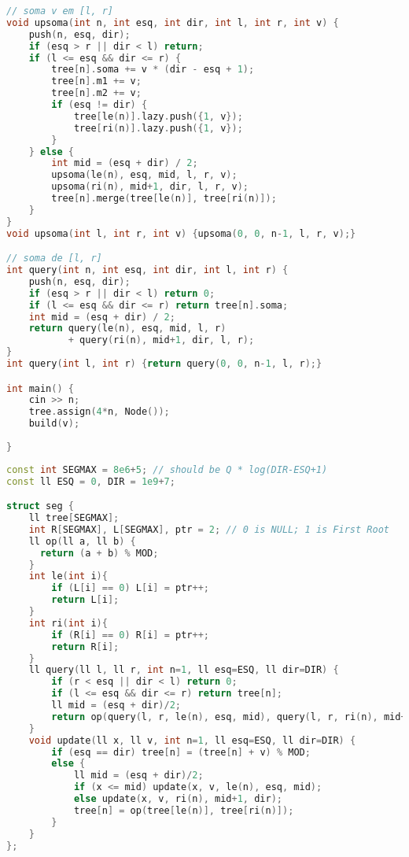 \documentclass[11pt, a4paper, twoside]{article}
\begin{document}
\begin{lstlisting}[language=C++]
// soma v em [l, r]
void upsoma(int n, int esq, int dir, int l, int r, int v) {
    push(n, esq, dir);
    if (esq > r || dir < l) return;
    if (l <= esq && dir <= r) {
        tree[n].soma += v * (dir - esq + 1);
        tree[n].m1 += v;
        tree[n].m2 += v;
        if (esq != dir) {
            tree[le(n)].lazy.push({1, v});
            tree[ri(n)].lazy.push({1, v});
        }
    } else {
        int mid = (esq + dir) / 2;
        upsoma(le(n), esq, mid, l, r, v);
        upsoma(ri(n), mid+1, dir, l, r, v);
        tree[n].merge(tree[le(n)], tree[ri(n)]);
    }
}
void upsoma(int l, int r, int v) {upsoma(0, 0, n-1, l, r, v);}

// soma de [l, r]
int query(int n, int esq, int dir, int l, int r) {
    push(n, esq, dir);
    if (esq > r || dir < l) return 0;
    if (l <= esq && dir <= r) return tree[n].soma;
    int mid = (esq + dir) / 2;
    return query(le(n), esq, mid, l, r)
           + query(ri(n), mid+1, dir, l, r);
}
int query(int l, int r) {return query(0, 0, n-1, l, r);}

int main() {
    cin >> n;    
    tree.assign(4*n, Node());
    build(v);
    
}
\end{lstlisting}

\begin{lstlisting}[language=C++]
const int SEGMAX = 8e6+5; // should be Q * log(DIR-ESQ+1)
const ll ESQ = 0, DIR = 1e9+7;

struct seg {
	ll tree[SEGMAX];
    int R[SEGMAX], L[SEGMAX], ptr = 2; // 0 is NULL; 1 is First Root
    ll op(ll a, ll b) {
      return (a + b) % MOD;
    }
	int le(int i){
		if (L[i] == 0) L[i] = ptr++;
		return L[i];
	}
	int ri(int i){
		if (R[i] == 0) R[i] = ptr++;
		return R[i];
	}
	ll query(ll l, ll r, int n=1, ll esq=ESQ, ll dir=DIR) {
		if (r < esq || dir < l) return 0;
		if (l <= esq && dir <= r) return tree[n];
		ll mid = (esq + dir)/2;
		return op(query(l, r, le(n), esq, mid), query(l, r, ri(n), mid+1, dir));
	}
	void update(ll x, ll v, int n=1, ll esq=ESQ, ll dir=DIR) {
		if (esq == dir) tree[n] = (tree[n] + v) % MOD;
        else {
            ll mid = (esq + dir)/2;
            if (x <= mid) update(x, v, le(n), esq, mid);
            else update(x, v, ri(n), mid+1, dir);
            tree[n] = op(tree[le(n)], tree[ri(n)]); 
        }
	}
};
\end{lstlisting}
\end{document}
